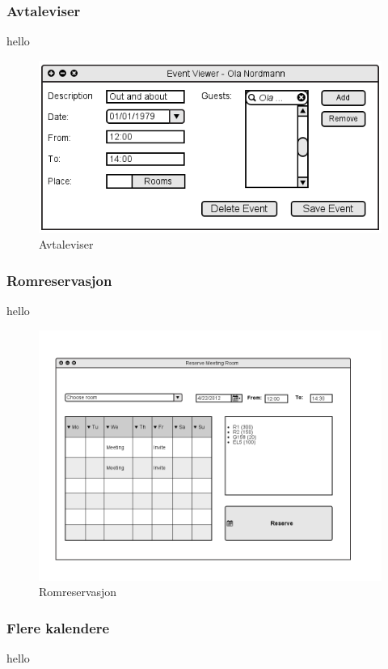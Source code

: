 \subsubsection{Avtaleviser}
hello

\begin{figure}[H]
\centering
\includegraphics[scale=0.65]{images/avtaleviser.png}
\caption{Avtaleviser}
\label{avtaleviser_image}
\end{figure}

\subsubsection{Romreservasjon}
hello

\begin{figure}[H]
\centering
\includegraphics[scale=0.65]{images/romreservasjon.png}
\caption{Romreservasjon}
\label{romreservasjon_image}
\end{figure}

\subsubsection{Flere kalendere}
hello

